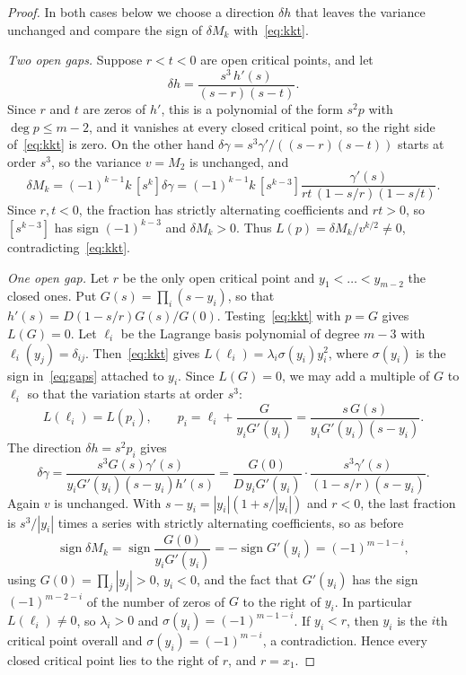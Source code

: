 \documentclass[11pt]{article}
\theoremstyle{remark}
\newcommand{\sgn}{\operatorname{sign}}
\begin{document}
\begin{proof}
In both cases below we choose a direction $\delta h$ that leaves the
variance unchanged and compare the sign of $\delta M_k$
with~\eqref{eq:kkt}.

\emph{Two open gaps.} Suppose $r<t<0$ are open critical points, and let
\[
\delta h=\frac{s^3\,h'(s)}{(s-r)(s-t)}.
\]
Since $r$ and $t$ are zeros of $h'$, this is a polynomial of the form
$s^2p$ with $\deg p\le m-2$, and it vanishes at every closed critical
point, so the right side of~\eqref{eq:kkt} is zero. On the other hand
$\delta\gamma=s^3\gamma'/((s-r)(s-t))$ starts at order $s^3$, so the
variance $v=M_2$ is unchanged, and
\[
\delta M_k=(-1)^{k-1}k\,[s^k]\delta\gamma
=(-1)^{k-1}k\,[s^{k-3}]\frac{\gamma'(s)}{rt\,(1-s/r)(1-s/t)}.
\]
Since $r,t<0$, the fraction has strictly alternating coefficients and
$rt>0$, so $[s^{k-3}]$ has sign $(-1)^{k-3}$ and $\delta M_k>0$. Thus
$L(p)=\delta M_k/v^{k/2}\ne0$, contradicting~\eqref{eq:kkt}.

\emph{One open gap.} Let $r$ be the only open critical point and
$y_1<\dots<y_{m-2}$ the closed ones. Put $G(s)=\prod_i(s-y_i)$, so that
$h'(s)=D(1-s/r)G(s)/G(0)$. Testing~\eqref{eq:kkt} with $p=G$ gives
$L(G)=0$. Let $\ell_i$ be the Lagrange basis polynomial of degree $m-3$ with
$\ell_i(y_j)=\delta_{ij}$. Then~\eqref{eq:kkt} gives
$L(\ell_i)=\lambda_i\sigma(y_i)y_i^2$, where $\sigma(y_i)$ is the sign
in~\eqref{eq:gaps} attached to $y_i$. Since $L(G)=0$, we may add a multiple
of $G$ to $\ell_i$ so that the variation starts at order $s^3$:
\[
L(\ell_i)=L(p_i),\qquad
p_i=\ell_i+\frac{G}{y_iG'(y_i)}=\frac{s\,G(s)}{y_iG'(y_i)(s-y_i)}.
\]
The direction $\delta h=s^2p_i$ gives
\[
\delta\gamma=\frac{s^3G(s)\gamma'(s)}{y_iG'(y_i)(s-y_i)h'(s)}
=\frac{G(0)}{D\,y_iG'(y_i)}\cdot
\frac{s^3\gamma'(s)}{(1-s/r)(s-y_i)}.
\]
Again $v$ is unchanged. With $s-y_i=|y_i|(1+s/|y_i|)$ and $r<0$, the last
fraction is $s^3/|y_i|$ times a series with strictly alternating
coefficients, so as before
\[
\sgn\delta M_k=\sgn\frac{G(0)}{y_iG'(y_i)}=-\sgn G'(y_i)=(-1)^{m-1-i},
\]
using $G(0)=\prod_j|y_j|>0$, $y_i<0$, and the fact that $G'(y_i)$ has the
sign $(-1)^{m-2-i}$ of the number of zeros of $G$ to the right of $y_i$. In
particular $L(\ell_i)\ne0$, so $\lambda_i>0$ and $\sigma(y_i)=(-1)^{m-1-i}$.
If $y_i<r$, then $y_i$ is the $i$th critical point overall and
$\sigma(y_i)=(-1)^{m-i}$, a contradiction. Hence every closed critical point
lies to the right of $r$, and $r=x_1$.
\end{proof}
\end{document}
